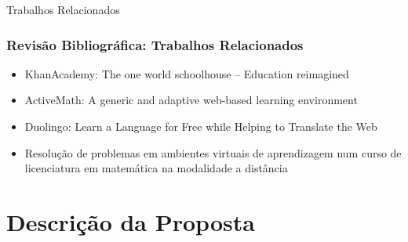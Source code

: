 \documentclass[aspectratio=169]{beamer}
\begin{document}
\begin{frame}{Trabalhos Relacionados}
\frametitle{Revisão Bibliográfica: Trabalhos Relacionados}

\begin{itemize}
	\item KhanAcademy: The one world schoolhouse -- Education reimagined
	\item ActiveMath: A generic and adaptive web-based learning environment
	\item Duolingo: Learn a Language for Free while Helping to Translate the Web
	\item Resolução de problemas em ambientes virtuais de aprendizagem num curso de licenciatura em matemática na modalidade a distância
\end{itemize}

\end{frame}

\section{Descrição da Proposta}

\setcounter{figure}{0}
\end{document}
